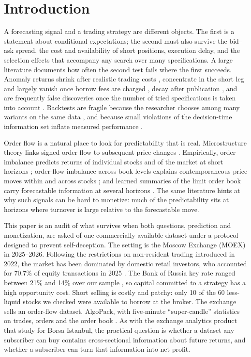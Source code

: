 \section{Introduction}\label{sec:intro}

A forecasting signal and a trading strategy are different objects. The first is a statement about conditional expectations; the second must also survive the bid--ask spread, the cost and availability of short positions, execution delay, and the selection effects that accompany any search over many specifications. A large literature documents how often the second test fails where the first succeeds. Anomaly returns shrink after realistic trading costs \citep{novymarx2016}, concentrate in the short leg and largely vanish once borrow fees are charged \citep{muravyev2025}, decay after publication \citep{mclean2016}, and are frequently false discoveries once the number of tried specifications is taken into account \citep{harvey2016,harvey2020,chordia2020,hou2020}. Backtests are fragile because the researcher chooses among many variants on the same data \citep{bailey2014notices,bailey2017pbo,novymarx2015}, and because small violations of the decision-time information set inflate measured performance \citep{kaufman2012,zhang2026}.

Order flow is a natural place to look for predictability that is real. Microstructure theory links signed order flow to subsequent price changes \citep{kyle1985}. Empirically, order imbalance predicts returns of individual stocks and of the market at short horizons \citep{chordia2002,chordia2004}; order-flow imbalance across book levels explains contemporaneous price moves within and across stocks \citep{cont2014,cont2023}; and learned summaries of the limit order book carry forecastable information at several horizons \citep{kolm2023}. The same literature hints at why such signals can be hard to monetize: much of the predictability sits at horizons where turnover is large relative to the forecastable move.

This paper is an audit of what survives when both questions, prediction and monetization, are asked of one commercially available dataset under a protocol designed to prevent self-deception. The setting is the Moscow Exchange (MOEX) in 2025--2026. Following the restrictions on non-resident trading introduced in 2022, the market has been dominated by domestic retail investors, who accounted for 70.7\% of equity transactions in 2025 \citep{moex2026retail}. The Bank of Russia key rate ranged between 21\% and 14\% over our sample \citep{cbr2026}, so capital committed to a strategy has a high opportunity cost. Short selling is costly and patchy: only 10 of the 60 less-liquid stocks we checked were available to borrow at the broker. The exchange sells an order-flow dataset, AlgoPack, with five-minute ``super-candle'' statistics on trades, orders and the order book \citep{moexalgo}. As with the exchange analytics product that \citet{akyildirim2021} study for Borsa Istanbul, the practical question is whether a dataset any subscriber can buy contains cross-sectional information about future returns, and whether a subscriber can turn that information into net profit.

